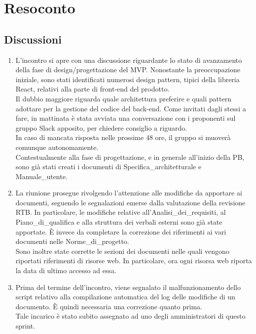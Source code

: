 \section{Resoconto} \label{sec:resoconto}
\subsection{Discussioni} \label{subsec:resdiscussione}
\begin{enumerate}
    \item L'incontro si apre con una discussione riguardante lo stato di avanzamento della fase di design/progettazione del MVP. Nonostante la preoccupazione iniziale, sono stati identificati numerosi design pattern, tipici della libreria React, relativi alla parte di front-end del prodotto.\\
    Il dubbio maggiore riguarda quale architettura preferire e quali pattern adottare per la gestione del codice del back-end. Come invitati dagli stessi a fare, in mattinata è stata avviata una conversazione con i proponenti sul gruppo Slack apposito, per chiedere consiglio a riguardo.\\
    In caso di mancata risposta nelle prossime 48 ore, il gruppo si muoverà comunque autonomamente.\\
    Contestualmente alla fase di progettazione, e in generale all'inizio della PB, sono già stati creati i documenti di Specifica\_architetturale e Manuale\_utente.
    \item La riunione prosegue rivolgendo l'attenzione alle modifiche da apportare ai documenti, seguendo le segnalazioni emerse dalla valutazione della revisione RTB. In particolare, le modifiche relative all'Analisi\_dei\_requisiti, al Piano\_di\_qualifica e alla struttura dei verbali esterni sono già state apportate. È invece da completare la correzione dei riferimenti ai vari documenti nelle Norme\_di\_progetto.\\
    Sono inoltre state corrette le sezioni dei documenti nelle quali vengono riportati riferimenti di risorse web. In particolare, ora ogni risorsa web riporta la data di ultimo accesso ad essa.
    \item Prima del termine dell'incontro, viene segnalato il malfunzionamento dello script relativo alla compilazione automatica del log delle modifiche di un documento. È quindi necessaria una correzione quanto prima.\\
    Tale incarico è stato subito assegnato ad uno degli amministratori di questo sprint.
\end{enumerate}

